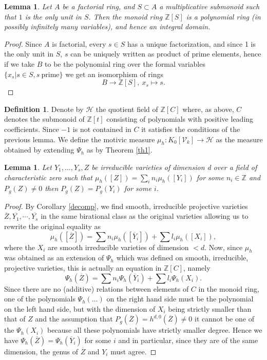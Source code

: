 \documentclass[11pt, a4paper, english, twoside]{article}
\theoremstyle{plain}
\newtheorem{lemma}[theorem]{Lemma}
\theoremstyle{definition}
\newtheorem{definition}[theorem]{Definition}
\newcommand{\gring}[1][k]{K_0[\mathcal{V}_#1]}
\begin{document}
\begin{lemma}
    Let $A$ be a factorial ring, and $S \subset A$ a multiplicative submonoid such that $1$ is the only unit in $S$. Then the monoid ring
    $\mathbb{Z}[S]$ is a polynomial ring (in possibly infinitely many variables), and hence an integral domain.
\end{lemma}
\begin{proof}
    Since $A$ is factorial, every $s \in S$ has a unique factorization, and since 1 is the only unit in $S$, 
    $s$ can be uniquely written as product of prime elements, hence if we take $B$ to be the polynomial ring over the formal
    variables $\{x_s | s \in S, s\ \text{prime}\}$ we get an isomorphism of rings
    \[
        B \to \mathbb{Z}[S], \ x_s \mapsto s.
    \]
\end{proof}

\begin{definition}
    Denote by $\mathcal{H}$ the quotient field of $\mathbb{Z}[C]$ where, as above, $C$ denotes the submonoid of $\mathbb{Z}[t]$ 
    consisting of polynomials with positive leading coefficients. Since $-1$ is not contained in $C$ it satisfies the conditions of the
    previous lemma.
    We define the motivic measure $\mu_h \colon \gring \to \mathcal{H}$ as the measure obtained by extending $\Psi_h$ as by Theorem \ref{th1}.
\end{definition}

\begin{lemma}
    \label{same}
    Let $Y_1,\dots,Y_s,Z$ be irreducible varieties of dimension d over a field of characteristic zero 
    such that $\mu_h([Z]) = \sum_i n_i \mu_h([Y_i])$ for some $n_i \in \mathbb{Z}$ and $P_g(Z) \neq 0$ then $P_g(Z) = P_g(Y_i)$ for some $i$.
\end{lemma}
\begin{proof}
    By Corollary \ref{decomp}, we find smooth, irreducible projective varieties $\overline{Z},\overline{Y_1},\cdots, \overline{Y_s}$ in the same
    birational class as the original varieties allowing us to rewrite the original equality as 
    \[
        \mu_h([\overline{Z}]) = \sum n_i\mu_h([\overline{Y}_i]) + \sum l_i \mu_h([X_i]),
    \]
    where the $X_i$ are smooth irreducible varieties of dimension $<d$.
    Now, since $\mu_h$ was obtained as an extension of $\Psi_h$ which was defined on smooth, irreducible, projective varieties, this is
    actually an equation in $\mathbb{Z}[C]$, namely
    \[
        \Psi_h(\overline{Z}) = \sum n_i \Psi_h(\overline{Y}_i) + \sum l_i\Psi_h(X_i).
    \]
    Since there are no (additive) relations between elements of $C$ in the monoid ring, one of the polynomials $\Psi_h(\dots)$ on the 
    right hand side must be the polynomial on the left hand side, but with the dimension of 
    $X_i$ being strictly smaller than that of $Z$ and the assumption that
    $P_g(\overline{Z}) = h^{d,0}(\overline{Z}) \neq 0$ it cannot be one of the $\Psi_h(X_i)$ because all these polynomials have strictly smaller
    degree. Hence we have $\Psi_h(\overline{Z}) = \Psi_h(\overline{Y}_i)$ for some $i$ and in particular, since they are of the same dimension, 
    the genus of $\overline{Z}$ and $Y_i$ must agree.
\end{proof}
\end{document}
